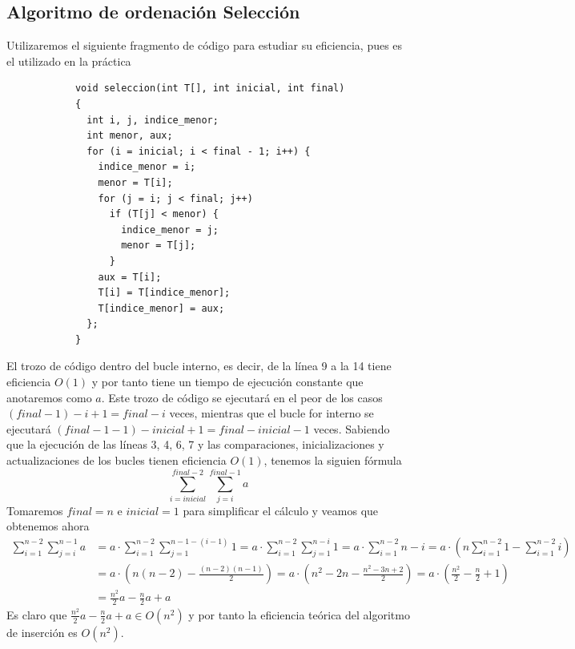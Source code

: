 \documentclass[11pt]{article}
\begin{document}
        \subsection*{Algoritmo de ordenación Selección}
        Utilizaremos el siguiente fragmento de código para estudiar su eficiencia, pues es el utilizado en la práctica
        \begin{lstlisting}
            void seleccion(int T[], int inicial, int final)
            {
              int i, j, indice_menor;
              int menor, aux;
              for (i = inicial; i < final - 1; i++) {
                indice_menor = i;
                menor = T[i];
                for (j = i; j < final; j++)
                  if (T[j] < menor) {
                    indice_menor = j;
                    menor = T[j];
                  }
                aux = T[i];
                T[i] = T[indice_menor];
                T[indice_menor] = aux;
              };
            }
        \end{lstlisting}
        El trozo de código dentro del bucle interno, es decir, de la línea 9 a la 14 tiene eficiencia $O(1)$ y por tanto
        tiene un tiempo de ejecución constante que anotaremos como $a$. Este trozo de código se ejecutará en el peor de los casos
        $(final-1)-i+1=final-i$ veces, mientras que el bucle for interno se ejecutará $(final-1-1)-inicial+1=final -inicial-1$ veces.
        Sabiendo que la ejecución de las líneas 3, 4, 6, 7 y las comparaciones, inicializaciones y actualizaciones de los 
        bucles tienen eficiencia $O(1)$, tenemos la siguien fórmula
        \begin{equation*}
            \sum_{i=inicial}^{final-2} \sum_{j=i}^{final-1}a 
        \end{equation*}
        Tomaremos $final =  n$ e $inicial = 1$ para simplificar el cálculo y veamos que obtenemos ahora
        \begin{equation*}\begin{split}
            \sum_{i=1}^{n-2} \sum_{j=i}^{n-1}a&= a \cdot \sum_{i=1}^{n-2} \sum_{j=1}^{n-1-(i-1)}1
             = a \cdot \sum_{i=1}^{n-2} \sum_{j=1}^{n-i}1=a \cdot \sum_{i=1}^{n-2} n-i= a \cdot (n\sum_{i=1}^{n-2}1 - \sum_{i=1}^{n-2}i) \\
            & = a \cdot\left(n(n-2)-\frac{(n-2)(n-1)}{2}\right)= a \cdot \left(n^2-2n-\frac{n^2-3n+2}{2}\right)= a \cdot \left(\frac{n^2}{2}-\frac{n}{2}+1\right) \\
            & = \frac{n^2}{2}a-\frac{n}{2}a+a
        \end{split}\end{equation*}
        Es claro que $\frac{n^2}{2}a-\frac{n}{2}a+a \in O(n^2)$ y por tanto la eficiencia teórica del algoritmo de inserción es $O(n^2)$.
\end{document}
